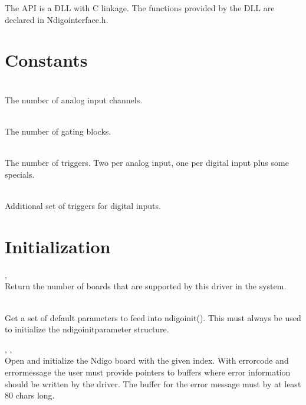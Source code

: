 The API is a DLL with C linkage. The functions provided by the DLL are declared in \textsf{Ndigo\tu interface.h}. \par

\section{Constants}

    \\
    The number of analog input channels.\par

    \\
    The number of gating blocks.\par

    \\
    The number of triggers. Two per analog input, one per digital input plus some specials.\par

    \\
    Additional set of triggers for digital inputs.

    \section{Initialization}

        , \\
        Return the number of boards that are supported by this driver in the system.\par

        \\
        Get a set of default parameters to feed into \textsf{ndigo\tu init()}. This must always be used to initialize the \textsf{ndigo\tu init\tu parameter structure}.\par

        , ,\newline {}\\
        Open and initialize the Ndigo board with the given index. With \textsf{error\tu code} and \textsf{error\tu message} the user must provide pointers to buffers where error information should be written by the driver. The buffer for the error message must by at least 80 chars long.\par

